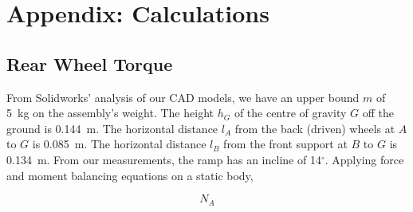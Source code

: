 \newpage
\appendix
\section{Appendix: Calculations} %
\label{AppendixA}

	\subsection{Rear Wheel Torque}
	From Solidworks' analysis of our CAD models, we have an upper bound $m$ of 5~kg on the assembly's weight. The height $h_G$ of the centre of gravity $G$ off the ground is 0.144~m. The horizontal distance $l_A$ from the back (driven) wheels at $A$ to $G$ is 0.085~m. The horizontal distance $l_B$ from the front support at $B$ to $G$ is 0.134~m. From our measurements, the ramp has an incline of 14$^\circ$. Applying force and moment balancing equations on a static body,
	
	$$N_A$$
	